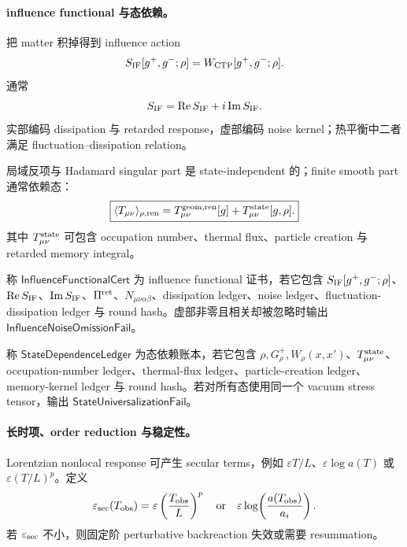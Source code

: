 \paragraph{influence functional 与态依赖。}
把 matter 积掉得到 influence action
\[
S_{\rm IF}[g^+,g^-;\rho]=W_{\rm CTP}[g^+,g^-;\rho].
\]
通常
\[
S_{\rm IF}={\rm Re}\,S_{\rm IF}+i\,{\rm Im}\,S_{\rm IF}.
\]
实部编码 dissipation 与 retarded response，虚部编码 noise kernel；热平衡中二者满足 fluctuation--dissipation relation。

局域反项与 Hadamard singular part 是 state-independent 的；finite smooth part 通常依赖态：
\[
\boxed{
\langle T_{\mu\nu}\rangle_{\rho,{\rm ren}}
=
T_{\mu\nu}^{\rm geom,ren}[g]
+T_{\mu\nu}^{\rm state}[g,\rho].
}
\]
其中 \(T_{\mu\nu}^{\rm state}\) 可包含 occupation number、thermal flux、particle creation 与 retarded memory integral。

\begin{definition}\label{def:typed-address-biaxial-completion-influence-functional-cert}
称 \(\mathsf{InfluenceFunctionalCert}\) 为 influence functional 证书，若它包含 \(S_{\rm IF}[g^+,g^-;\rho]\)、\({\rm Re}\,S_{\rm IF}\)、\({\rm Im}\,S_{\rm IF}\)、\(\Pi^{\rm ret}\)、\(N_{\mu\nu\alpha\beta}\)、dissipation ledger、noise ledger、fluctuation-dissipation ledger 与 round hash。虚部非零且相关却被忽略时输出 \(\mathsf{InfluenceNoiseOmissionFail}\)。
\end{definition}

\begin{definition}[态依赖账本]\label{def:typed-address-biaxial-completion-state-dependence-ledger}
称 \(\mathsf{StateDependenceLedger}\) 为态依赖账本，若它包含 \(\rho,G^+_\rho,W_\rho(x,x')\)、\(T_{\mu\nu}^{\rm state}\)、occupation-number ledger、thermal-flux ledger、particle-creation ledger、memory-kernel ledger 与 round hash。若对所有态使用同一个 vacuum stress tensor，输出 \(\mathsf{StateUniversalizationFail}\)。
\end{definition}

\paragraph{长时项、order reduction 与稳定性。}
Lorentzian nonlocal response 可产生 secular terms，例如 \(\varepsilon T/L\)、\(\varepsilon\log a(T)\) 或 \(\varepsilon(T/L)^p\)。定义
\[
\varepsilon_{\rm sec}(T_{\rm obs})
=
\varepsilon\left(\frac{T_{\rm obs}}{L}\right)^p
\quad\text{or}\quad
\varepsilon\log\!\left(\frac{a(T_{\rm obs})}{a_i}\right).
\]
若 \(\varepsilon_{\rm sec}\) 不小，则固定阶 perturbative backreaction 失效或需要 resummation。

